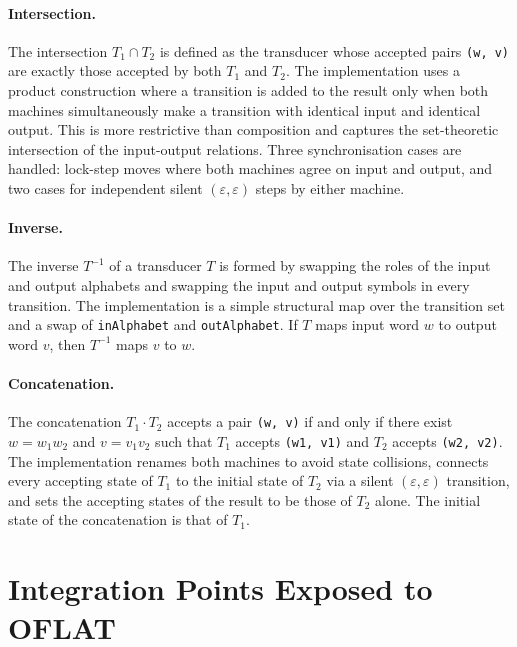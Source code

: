 \paragraph{Intersection.}
The intersection $T_1 \cap T_2$ is defined as the transducer whose accepted pairs \texttt{(w, v)} are exactly 
those accepted by both $T_1$ and $T_2$. The implementation uses a product construction where a transition 
is added to the result only when both machines simultaneously make a transition with identical input and identical output. 
This is more restrictive than composition and captures the set-theoretic intersection of the input-output relations. 
Three synchronisation cases are handled: lock-step moves where both machines agree on input and output, and two cases 
for independent silent $(\varepsilon, \varepsilon)$ steps by either machine.

\paragraph{Inverse.}
The inverse $T^{-1}$ of a transducer $T$ is formed by swapping the roles of the input and output alphabets and 
swapping the input and output symbols in every transition. The implementation is a simple structural map over the 
transition set and a swap of \texttt{inAlphabet} and \texttt{outAlphabet}. If $T$ maps input word $w$ to output word $v$, 
then $T^{-1}$ maps $v$ to $w$.

\paragraph{Concatenation.}
The concatenation $T_1 \cdot T_2$ accepts a pair \texttt{(w, v)} if and only if there exist $w = w_1 w_2$ and 
$v = v_1 v_2$ such that $T_1$ accepts \texttt{(w1, v1)} and $T_2$ accepts \texttt{(w2, v2)}. 
The implementation renames both machines to avoid state collisions, connects every accepting state of $T_1$ 
to the initial state of $T_2$ via a silent $(\varepsilon, \varepsilon)$ transition, and sets the accepting states of the result 
to be those of $T_2$ alone. The initial state of the concatenation is that of $T_1$.

\section{Integration Points Exposed to OFLAT}

